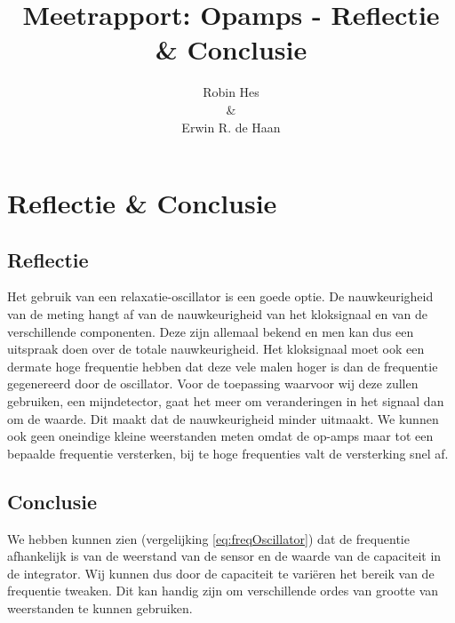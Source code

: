 \documentclass{report}
\title{Meetrapport: Opamps - Reflectie \& Conclusie}
\author{Robin Hes\\\&\\Erwin R. de Haan}
\begin{document}
\chapter{Reflectie \& Conclusie}
\section{Reflectie}

Het gebruik van een relaxatie-oscillator is een goede optie. De nauwkeurigheid van de meting hangt af van de nauwkeurigheid van het kloksignaal en van de verschillende componenten. Deze zijn allemaal bekend en men kan dus een uitspraak doen over de totale nauwkeurigheid. Het kloksignaal moet ook een dermate hoge frequentie hebben dat deze vele malen hoger is dan de frequentie gegenereerd door de oscillator. Voor de toepassing waarvoor wij deze zullen gebruiken, een mijndetector, gaat het meer om veranderingen in het signaal dan om de waarde. Dit maakt dat de nauwkeurigheid minder uitmaakt. We kunnen ook geen oneindige kleine weerstanden meten omdat de op-amps maar tot een bepaalde frequentie versterken, bij te hoge frequenties valt de versterking snel af.

\section{Conclusie}

We hebben kunnen zien (vergelijking \ref{eq:freqOscillator}) dat de frequentie afhankelijk is van de weerstand van de sensor en de waarde van de capaciteit in de integrator. Wij kunnen dus door de capaciteit te variëren het bereik van de frequentie tweaken. Dit kan handig zijn om verschillende ordes van grootte van weerstanden te kunnen gebruiken.
\end{document}
